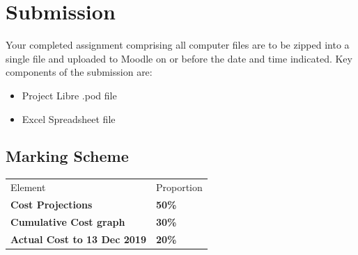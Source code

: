 \section*{Submission}
Your completed assignment comprising all computer files are to be zipped into a single file and uploaded to Moodle on or before the date and time indicated.  Key components of the submission are:
\begin{itemize}
	\item Project Libre .pod file
	\item Excel Spreadsheet file
\end{itemize}



\subsection*{Marking Scheme}

\begin{table}[h!]
     \begin{center}
     \begin{tabular}{p{5cm}  p{5cm} }
     \toprule
      \textbf\large{Element} & \textbf\large{Proportion} \\ 
    \cmidrule(r){1-1}\cmidrule(lr){2-2}
      \textbf{Cost Projections} & \textbf{50\%}\\
      \textbf{Cumulative Cost graph} & \textbf{30\%}\\
      \textbf{Actual Cost to 13 Dec 2019} & \textbf{20\%}
      
      \\ \bottomrule
      \end{tabular}
      \label{tbl:markSchemeAsmt3}
      \end{center}
 \end{table}

